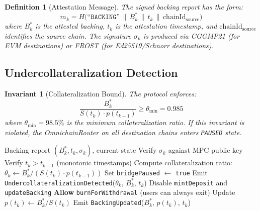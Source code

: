 \documentclass[11pt,twocolumn]{article}
\newtheorem{definition}{Definition}[section]
\newtheorem{invariant}{Invariant}[section]
\begin{document}
\begin{definition}[Attestation Message]
The signed backing report has the form:
\begin{equation}\label{eq:attestation}
  m_k = H\bigl(\texttt{``BACKING''} \,\|\, B^*_k \,\|\, t_k \,\|\, \text{chainId}_{\text{source}}\bigr)
\end{equation}
where $B^*_k$ is the attested backing, $t_k$ is the attestation timestamp, and $\text{chainId}_{\text{source}}$ identifies the source chain. The signature $\sigma_k$ is produced via CGGMP21 (for EVM destinations) or FROST (for Ed25519/Schnorr destinations).
\end{definition}

\subsection{Undercollateralization Detection}

\begin{invariant}[Collateralization Bound]\label{inv:collateral}
The protocol enforces:
\begin{equation}\label{eq:collateral}
  \frac{B^*_k}{S(t_k) \cdot p(t_{k-1})} \geq \theta_{\min} = 0.985
\end{equation}
where $\theta_{\min} = 98.5\%$ is the minimum collateralization ratio. If this invariant is violated, the OmnichainRouter on all destination chains enters \texttt{PAUSED} state.
\end{invariant}

\begin{algorithm}[H]
\caption{Auto-Pause on Undercollateralization}
\label{alg:autopause}
\begin{algorithmic}[1]
\Require Backing report $(B^*_k, t_k, \sigma_k)$, current state
\State Verify $\sigma_k$ against MPC public key
\State Verify $t_k > t_{k-1}$ (monotonic timestamps)
\State Compute collateralization ratio: $\theta_k \leftarrow B^*_k / (S(t_k) \cdot p(t_{k-1}))$
  \State Set \texttt{bridgePaused} $\leftarrow$ \texttt{true}
  \State Emit \texttt{UndercollateralizationDetected}($\theta_k$, $B^*_k$, $t_k$)
  \State Disable \texttt{mintDeposit} and \texttt{updateBacking}
  \State \textbf{Allow} \texttt{burnForWithdrawal} (users can always exit)
\Else
  \State Update $p(t_k) \leftarrow B^*_k / S(t_k)$
  \State Emit \texttt{BackingUpdated}($B^*_k$, $p(t_k)$, $t_k$)
\EndIf
\end{algorithmic}
\end{algorithm}
\end{document}
